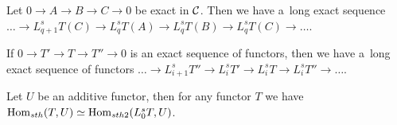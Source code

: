     \begin{proposition}
        Let $0 \to A \to B \to C \to 0$ be exact in $\mathcal{C}$.
        Then we have a~long exact sequence
        $\ldots \to L_{q+1}^s T(C) \to L_q^sT(A) \to L_q^sT(B) \to L_q^sT(C) \to \ldots$.
    \end{proposition}
    
    \begin{proposition}
        If $0 \to T' \to T \to T'' \to 0$ is an exact sequence of functors,
        then we have a~long exact sequence of functors
        $\ldots \to L_{i+1}^s T'' \to L_i^s T' \to L_i^s T \to L_i^s T'' \to \ldots$.
    \end{proposition}
    
    \begin{proposition}
        Let $U$ be an additive functor, then for any functor $T$ we have
        \\ $\operatorname{Hom}_{sth}(T,U) \simeq \operatorname{Hom}_{sth2}(L^s_0 T,U)$.
    \end{proposition}


 
 